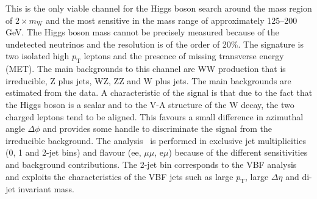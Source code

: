 \documentclass{cimento}
\newcommand{\MW}{\ensuremath{m_{\mathrm{W}}}\xspace}
\newcommand{\pt}{\ensuremath{p_{\mathrm{T}}}\xspace}
\begin{document}
This is the only viable channel for the Higgs boson search around the
mass region of $2\times\MW$ and the most sensitive in the mass range
of approximately 125--200 GeV.  The Higgs boson mass cannot be
precisely measured because of the undetected neutrinos and the
resolution is of the order of 20\%.  The signature is two isolated
high \pt leptons and the presence of missing transverse energy
(MET). 
The main backgrounds to this channel are WW production that is
irreducible, Z plus jets, WZ, ZZ and W plus jets. The main
backgrounds are estimated from the data.  A characteristic of the
signal is that due to the fact that the Higgs boson is a scalar and to
the V-A structure of the W decay, the two charged leptons tend to be
aligned. This favours a small difference in azimuthal angle
$\Delta\phi$ and provides some handle to discriminate the signal from
the irreducible background.  The analysis~\cite{Chatrchyan:2012ty} is
performed in exclusive jet multiplicities (0, 1 and 2-jet bins) and
flavour (ee, $\mu\mu$, e$\mu$) because of the different sensitivities
and background contributions. 
The 2-jet bin corresponds to the VBF analysis and exploits the
characteristics of the VBF jets such as large \pt, large $\Delta\eta$
and di-jet invariant mass.  
\end{document}
